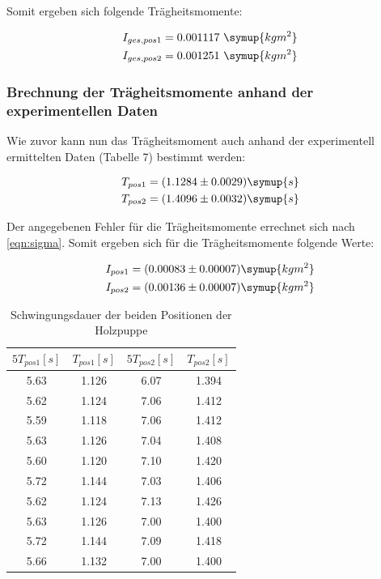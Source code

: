 Somit ergeben sich folgende Trägheitsmomente:

\begin{align}
  I_{ges,pos1} = 0.001117 \,\, \symup{kg m^2} \\
  I_{ges,pos2} = 0.001251 \,\, \symup{kg m^2}
\end{align}

\subsubsection{Brechnung der Trägheitsmomente anhand der experimentellen Daten}

Wie zuvor kann nun das Trägheitsmoment auch anhand der experimentell ermittelten Daten (Tabelle 7) bestimmt
werden:

\begin{align}
  T_{pos1} &= (1.1284 \pm 0.0029) \symup{s} \\
  T_{pos2} &= (1.4096 \pm 0.0032) \symup{s}
\end{align}

Der angegebenen Fehler für die Trägheitsmomente errechnet sich nach \eqref{eqn:sigma}.
Somit ergeben sich für die Trägheitsmomente folgende Werte:

\begin{align}
  I_{pos1} &= (0.00083 \pm 0.00007) \symup{kg m^2} \\
  I_{pos2} &= (0.00136 \pm 0.00007) \symup{kg m^2}
\end{align}

\begin{table}
  \centering
  \caption{Schwingungsdauer der beiden Positionen der Holzpuppe}
  \begin{tabular}{c c | c c}
    \toprule $5T_{pos1} [s]$ & $T_{pos1} [s]$ & $5T_{pos2} [s]$ & $T_{pos2} [s]$ \\
    \midrule
    5.63 & 1.126 & 6.07 & 1.394 \\
    5.62 & 1.124 & 7.06 & 1.412 \\
    5.59 & 1.118 & 7.06 & 1.412 \\
    5.63 & 1.126 & 7.04 & 1.408 \\
    5.60 & 1.120 & 7.10 & 1.420 \\
    5.72 & 1.144 & 7.03 & 1.406 \\
    5.62 & 1.124 & 7.13 & 1.426 \\
    5.63 & 1.126 & 7.00 & 1.400 \\
    5.72 & 1.144 & 7.09 & 1.418 \\
    5.66 & 1.132 & 7.00 & 1.400 \\
    \bottomrule
  \end{tabular}
\end{table}
